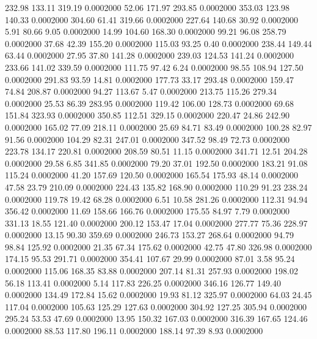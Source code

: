  232.98  133.11  319.19   0.0002000
  52.06  171.97  293.85   0.0002000
 353.03  123.98  140.33   0.0002000
 304.60   61.41  319.66   0.0002000
 227.64  140.68   30.92   0.0002000
   5.91   80.66    9.05   0.0002000
  14.99  104.60  168.30   0.0002000
  99.21   96.08  258.79   0.0002000
  37.68   42.39  155.20   0.0002000
 115.03   93.25    0.40   0.0002000
 238.44  149.44   63.44   0.0002000
  27.95   37.80  141.28   0.0002000
 239.03  124.53  141.24   0.0002000
 233.66  141.02  339.59   0.0002000
 111.75   97.42    6.24   0.0002000
  98.55  108.94  127.50   0.0002000
 291.83   93.59   14.81   0.0002000
 177.73   33.17  293.48   0.0002000
 159.47   74.84  208.87   0.0002000
  94.27  113.67    5.47   0.0002000
 213.75  115.26  279.34   0.0002000
  25.53   86.39  283.95   0.0002000
 119.42  106.00  128.73   0.0002000
  69.68  151.84  323.93   0.0002000
 350.85  112.51  329.15   0.0002000
 220.47   24.86  242.90   0.0002000
 165.02   77.09  218.11   0.0002000
  25.69   84.71   83.49   0.0002000
 100.28   82.97   91.56   0.0002000
 104.29   82.31  247.01   0.0002000
 347.52   98.49   72.73   0.0002000
 223.78  134.17  220.81   0.0002000
 208.59   80.51   11.15   0.0002000
 341.71   12.51  204.28   0.0002000
  29.58    6.85  341.85   0.0002000
  79.20   37.01  192.50   0.0002000
 183.21   91.08  115.24   0.0002000
  41.20  157.69  120.50   0.0002000
 165.54  175.93   48.14   0.0002000
  47.58   23.79  210.09   0.0002000
 224.43  135.82  168.90   0.0002000
 110.29   91.23  238.24   0.0002000
 119.78   19.42   68.28   0.0002000
   6.51   10.58  281.26   0.0002000
 112.31   94.94  356.42   0.0002000
  11.69  158.66  166.76   0.0002000
 175.55   84.97    7.79   0.0002000
 331.13   18.55  121.40   0.0002000
 200.12  153.47   17.04   0.0002000
 277.77   75.36  228.97   0.0002000
  13.15   90.30  359.69   0.0002000
 246.73  153.27  268.64   0.0002000
  94.79   98.84  125.92   0.0002000
  21.35   67.34  175.62   0.0002000
  42.75   47.80  326.98   0.0002000
 174.15   95.53  291.71   0.0002000
 354.41  107.67   29.99   0.0002000
  87.01    3.58   95.24   0.0002000
 115.06  168.35   83.88   0.0002000
 207.14   81.31  257.93   0.0002000
 198.02   56.18  113.41   0.0002000
   5.14  117.83  226.25   0.0002000
 346.16  126.77  149.40   0.0002000
 134.49  172.84   15.62   0.0002000
  19.93   81.12  325.97   0.0002000
  64.03   24.45  117.04   0.0002000
 105.63  125.29  127.63   0.0002000
 304.92  127.25  305.94   0.0002000
 295.24   53.53   47.69   0.0002000
  13.95  150.32  167.03   0.0002000
 316.39  167.65  124.46   0.0002000
  88.53  117.80  196.11   0.0002000
 188.14   97.39    8.93   0.0002000
